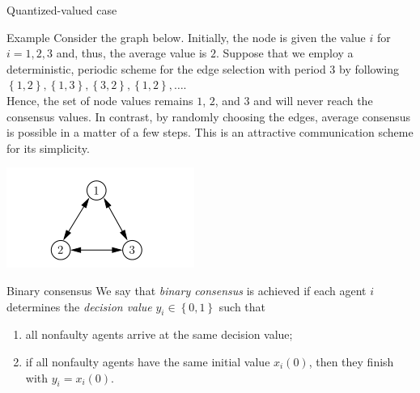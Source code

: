 \documentclass[xcolor={dvipsnames}]{beamer}
\begin{document}
	\begin{frame}{Quantized-valued case}%
		
		
		\begin{exampleblock}{Example}
			Consider the graph below. Initially, the node is given the value $i$ for $i = 1, 2, 3$ and, thus, the average value is $2$. 
			Suppose that we employ a deterministic, periodic scheme for the edge selection with period 3 by following $\left\{ 1, 2 \right\}, \left\{ 1, 3 \right\}, \left\{ 3, 2 \right\}, \left\{ 1, 2 \right\}, \ldots$.\\
			Hence, the set of node values remains $1$, $2$, and $3$ and will never reach the consensus values. In contrast, by randomly choosing the edges, average consensus is possible in a matter of a few steps. This is an attractive communication scheme for its simplicity.
		\end{exampleblock}
		\begin{center}
			\includegraphics[width=0.3\linewidth]{3.png}
		\end{center}
	\end{frame}
	
	\begin{frame}{Binary consensus}
		We say that \textit{binary consensus} is
		achieved if each agent $i$ determines the \textit{decision value} $y_{i} \in \left\{ 0,1 \right\}$ such that
		\begin{enumerate}[label=(\roman*)]
			\item all nonfaulty agents arrive at the same decision value;
			
			\item if all nonfaulty agents have the same initial value
			$x_{i}(0)$, then they finish with $y_{i} = x_{i}(0)$.
		\end{enumerate}
	\end{frame}
	
\end{document}
